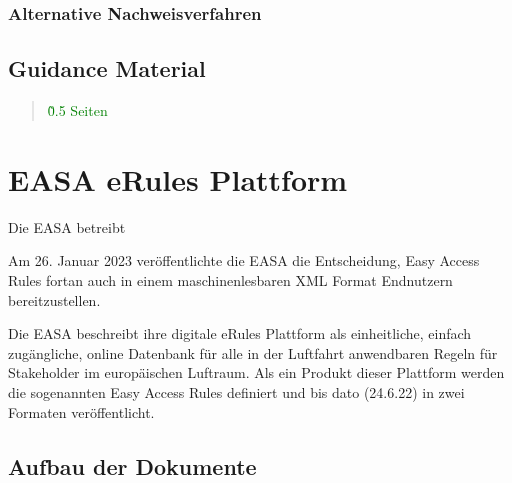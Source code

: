     \subsubsection{Alternative Nachweisverfahren}
        
        

\subsection{Guidance Material}

\begin{quote}
\textcolor{green}{\~0.5 Seiten}
\end{quote}
        \pagebreak
    \section{EASA eRules Plattform}

    Die EASA betreibt 

        Am 26. Januar 2023 veröffentlichte die EASA die Entscheidung, Easy Access Rules fortan auch in einem maschinenlesbaren XML Format Endnutzern bereitzustellen. \cite{easa_xml_publication}

    Die EASA beschreibt ihre digitale eRules Plattform als einheitliche, einfach zugängliche, online Datenbank für alle in der Luftfahrt anwendbaren Regeln für Stakeholder im europäischen Luftraum.
    Als ein Produkt dieser Plattform werden die sogenannten Easy Access Rules definiert und bis dato (24.6.22) in zwei Formaten veröffentlicht. 
    \cite{easa_xml_doc}

        
        
        \subsection{Aufbau der Dokumente}

